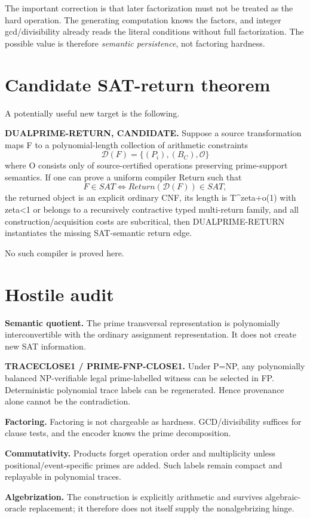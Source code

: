 \documentclass[11pt]{article}
\begin{document}
The important correction is that later factorization must not be treated as the hard operation. The generating computation knows the factors, and integer gcd/divisibility already reads the literal conditions without full factorization. The possible value is therefore \emph{semantic persistence}, not factoring hardness.

\section*{Candidate SAT-return theorem}
A potentially useful new target is the following.

\textbf{DUALPRIME-RETURN, CANDIDATE.}
Suppose a source transformation maps F to a polynomial-length collection of arithmetic constraints
\[
\mathcal D(F)=\{(P_i),(B_C),\mathcal O\}
\]
where \mathcal O consists only of source-certified operations preserving prime-support semantics. If one can prove a uniform compiler Return such that
\[
F\in SAT\iff Return(\mathcal D(F))\in SAT,
\]
the returned object is an explicit ordinary CNF, its length is T^{zeta+o(1)} with zeta<1 or belongs to a recursively contractive typed multi-return family, and all construction/acquisition costs are subcritical, then DUALPRIME-RETURN instantiates the missing SAT-semantic return edge.

No such compiler is proved here.

\section*{Hostile audit}
\textbf{Semantic quotient.} The prime transversal representation is polynomially interconvertible with the ordinary assignment representation. It does not create new SAT information.

\textbf{TRACECLOSE1 / PRIME-FNP-CLOSE1.} Under P=NP, any polynomially balanced NP-verifiable legal prime-labelled witness can be selected in FP. Deterministic polynomial trace labels can be regenerated. Hence provenance alone cannot be the contradiction.

\textbf{Factoring.} Factoring is not chargeable as hardness. GCD/divisibility suffices for clause tests, and the encoder knows the prime decomposition.

\textbf{Commutativity.} Products forget operation order and multiplicity unless positional/event-specific primes are added. Such labels remain compact and replayable in polynomial traces.

\textbf{Algebrization.} The construction is explicitly arithmetic and survives algebraic-oracle replacement; it therefore does not itself supply the nonalgebrizing hinge.
\end{document}
